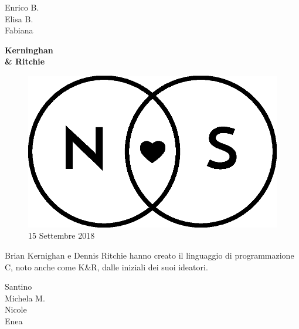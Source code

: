 \documentclass[20pt]{extarticle}
\begin{document}
\begin{center}
\begin{minipage}[c][\textheight]{0.25\textwidth}
\raggedleft
{\Large Enrico B.\\
Elisa B.\\
Fabiana\\}
\end{minipage}%
\begin{minipage}[c][\textheight]{0.5\textwidth}
\centering
{\Huge \textbf{Kerninghan \\\& Ritchie}}\par\bigskip
\vfill
\begin{figure}[H]
\centering
\includegraphics[scale=0.5]{img/Logo_piccolo.eps}
\vfill
\small15 Settembre 2018\\
\end{figure}
\vfill
Brian Kernighan e Dennis Ritchie hanno creato il linguaggio di programmazione C, noto anche come K\&R, dalle iniziali dei suoi ideatori.
\vfill
\end{minipage}%
\begin{minipage}[c][\textheight]{0.25\textwidth}
\raggedright
{\Large Santino\\
Michela M.\\
Nicole\\
Enea\\}
\end{minipage}
\end{center}
\end{document}

